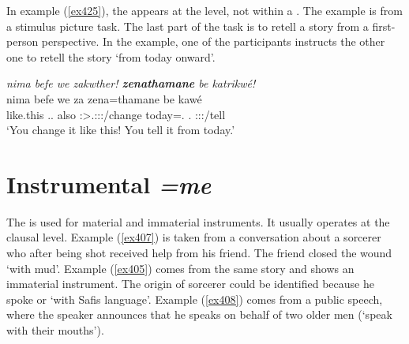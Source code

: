 In example (\ref{ex425}), the    appears at the  level, not within a . The example is from a stimulus picture task. The last part of the task is to retell a story from a first-person perspective. In the example, one of the participants instructs the other one to retell the story `from today onward'.

\begin{exe}
	\ex \emph{nima befe we zakwther! \textbf{zenathamane} be katrikwé!}\\
	\gll nima befe we za zena=thamane be kawé\\
	{like.this} \Ssg.\Erg.{\Emph} also \Ssg:\Sbj>\Tsg.\F:\Obj:\Imp:\Pfv/change today=\Temp.{\Poss} \Ssg.{\Erg} \Ssg:\Sbj:\Imp:\Ipfv/tell\\
	\trans `You change it like this! You tell it from today.'
	\label{ex425}
\end{exe}

\section{Instrumental \emph{=me}} \label{inscase}

The   is used for material and immaterial instruments. It usually operates at the clausal level. Example (\ref{ex407}) is taken from a conversation about a sorcerer who \textendash{} after being shot \textendash{} received help from his friend. The friend closed the wound `with mud'. Example (\ref{ex405}) comes from the same story and shows an immaterial instrument. The origin of sorcerer could be identified because he spoke  or `with Safis language'. Example (\ref{ex408}) comes from a public speech, where the speaker announces that he speaks on behalf of two older men (`speak with their mouths').

